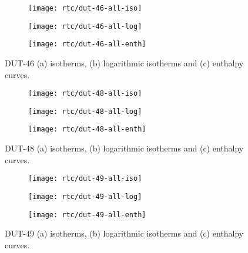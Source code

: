 \begin{figure}[H]
    \centering
    \begin{subfigure}{0.33\linewidth}
        \texttt{[image: rtc/dut-46-all-iso]}%
        \caption{}\label{appx:dut:fig:dut-46-all-iso}
    \end{subfigure}%
    \begin{subfigure}{0.33\linewidth}
        \texttt{[image: rtc/dut-46-all-log]}%
        \caption{}
    \end{subfigure}%
    \begin{subfigure}{0.33\linewidth}
        \texttt{[image: rtc/dut-46-all-enth]}%
        \caption{}
    \end{subfigure}%
    \caption{DUT-46 (a) isotherms, (b) logarithmic isotherms and 
    (c) enthalpy curves.}%
    \label{appx:dut:fig:dut-46-butane-rtc}
\end{figure}

\begin{figure}[H]
    \centering
    \begin{subfigure}{0.33\linewidth}
        \texttt{[image: rtc/dut-48-all-iso]}%
        \caption{}
    \end{subfigure}%
    \begin{subfigure}{0.33\linewidth}
        \texttt{[image: rtc/dut-48-all-log]}%
        \caption{}
    \end{subfigure}%
    \begin{subfigure}{0.33\linewidth}
        \texttt{[image: rtc/dut-48-all-enth]}%
        \caption{}
    \end{subfigure}%
    \caption{DUT-48 (a) isotherms, (b) logarithmic isotherms and 
    (c) enthalpy curves.}%
    \label{appx:dut:fig:dut-48-butane-rtc}
\end{figure}

\begin{figure}[H]
    \centering
    \begin{subfigure}{0.33\linewidth}
        \texttt{[image: rtc/dut-49-all-iso]}%
        \caption{}
    \end{subfigure}%
    \begin{subfigure}{0.33\linewidth}
        \texttt{[image: rtc/dut-49-all-log]}%
        \caption{}
    \end{subfigure}%
    \begin{subfigure}{0.33\linewidth}
        \texttt{[image: rtc/dut-49-all-enth]}%
        \caption{}
    \end{subfigure}%
    \caption{DUT-49 (a) isotherms, (b) logarithmic isotherms and 
    (c) enthalpy curves.}%
    \label{appx:dut:fig:dut-49-butane-rtc}
\end{figure}

